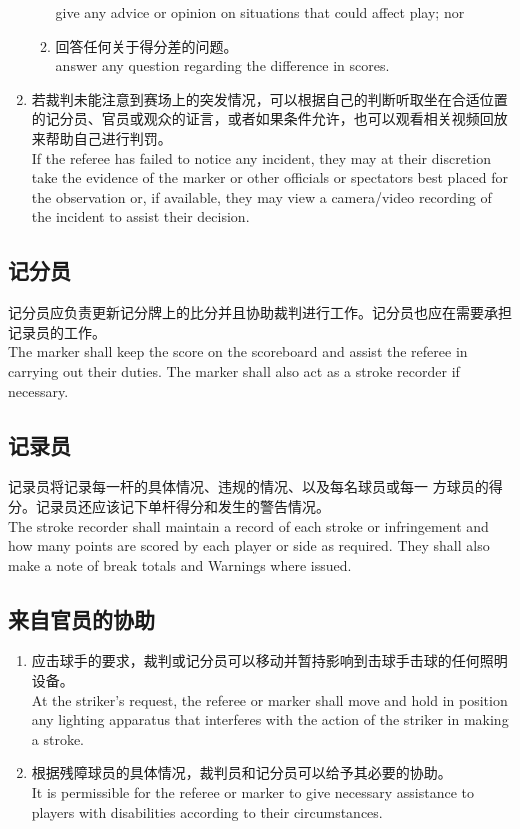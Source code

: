 \begin{enumerate}[label=(\alph*)]
\begin{enumerate}[label=(\roman*)]
        give any advice or opinion on situations that could affect play; nor
        \item 回答任何关于得分差的问题。\\
        answer any question regarding the difference in scores.
    \end{enumerate}
    \item 若裁判未能注意到赛场上的突发情况，可以根据自己的判断听取坐在合适位置的记分员、官员或观众的证言，或者如果条件允许，也可以观看相关视频回放来帮助自己进行判罚。\\
    If the referee has failed to notice any incident, they may at their discretion take the evidence of the marker or other officials or spectators best placed for the observation or, if available, they may view a camera/video recording of the incident to assist their decision.
\end{enumerate}

\subsection{记分员}

\noindent 记分员应负责更新记分牌上的比分并且协助裁判进行工作。记分员也应在需要承担记录员的工作。\\
The marker shall keep the score on the scoreboard and assist the referee in carrying out their duties. The marker shall also act as a stroke recorder if necessary.

\subsection{记录员}

\noindent 记录员将记录每一杆的具体情况、违规的情况、以及每名球员或每一
方球员的得分。记录员还应该记下单杆得分和发生的警告情况。\\
The stroke recorder shall maintain a record of each stroke or infringement and how many points are scored by each player or side as required. They shall also make a note of break totals and Warnings where issued.

\subsection{来自官员的协助}

\begin{enumerate}[label=(\alph*)]
    \item 应击球手的要求，裁判或记分员可以移动并暂持影响到击球手击球的任何照明设备。\\
    At the striker's request, the referee or marker shall move and hold in position any lighting apparatus that interferes with the action of the striker in making a stroke.
    \item 根据残障球员的具体情况，裁判员和记分员可以给予其必要的协助。\\
    It is permissible for the referee or marker to give necessary assistance to players with disabilities according to their circumstances.
\end{enumerate}
